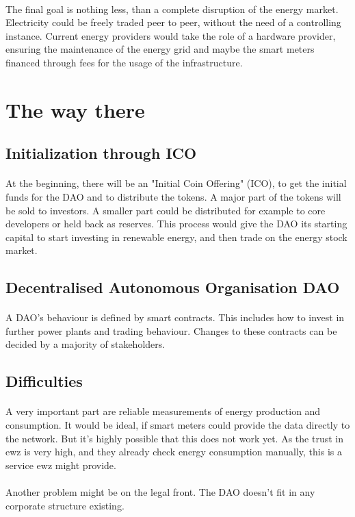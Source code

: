 \documentclass{scrartcl}
\begin{document}
	\paragraph{}
	The final goal is nothing less, than a complete disruption of the energy market. Electricity could be freely traded peer to peer, without the need of a controlling instance. Current energy providers would take the role of a hardware provider, ensuring the maintenance of the energy grid and maybe the smart meters financed through fees for the usage of the infrastructure. 
	
	\section{The way there}
	
	\subsection{Initialization through ICO}
	
	\paragraph{}
	At the beginning, there will be an "Initial Coin Offering" (ICO), to get the initial funds for the DAO and to distribute the tokens. A major part of the tokens will be sold to investors. A smaller part could be distributed for example to core developers or held back as reserves. This process would give the DAO its starting capital to start investing in renewable energy, and then trade on the energy stock market.
	
	\subsection{Decentralised Autonomous Organisation DAO}
	
	\paragraph{}
	A DAO's behaviour is defined by smart contracts. This includes how to invest in further power plants  and trading behaviour. Changes to these contracts can be decided by a majority of stakeholders. 
	
	\subsection{Difficulties}
	
	\paragraph{}
	A very important part are reliable measurements of energy production and consumption. It would be ideal, if smart meters could provide the data directly to the network. But it's highly possible that this does not work yet. As the trust in ewz is very high, and they already check energy consumption manually, this is a service ewz might provide.
	
	\paragraph{}
	Another problem might be on the legal front. The DAO doesn't fit in any corporate structure existing. 
	
\end{document}
